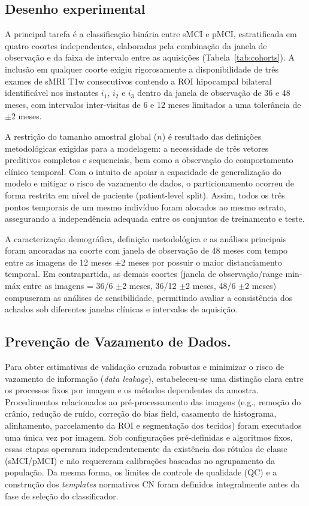 \documentclass[review]{elsarticle}
\begin{document}
	\subsection{Desenho experimental}\label{sec:experiments}
	
	A principal tarefa é a classificação binária entre sMCI e pMCI, estratificada em quatro coortes independentes, elaboradas pela combinação da janela de observação e da faixa de intervalo entre as aquisições (Tabela~\ref{tab:cohorts}). A inclusão em qualquer coorte exigiu rigorosamente a disponibilidade de três exames de sMRI T1w consecutivos contendo a ROI hipocampal bilateral identificável nos instantes $i_1$, $i_2$ e $i_3$ dentro da janela de observação de 36 e 48 meses, com intervalos inter-visitas de 6 e 12 meses limitados a uma tolerância de $\pm 2$ meses.
	
	A restrição do tamanho amostral global ($n$) é resultado das definições metodológicas exigidas para a modelagem: a necessidade de três vetores preditivos completos e sequenciais, bem como a observação do comportamento clínico temporal. Com o intuito de apoiar a capacidade de generalização do modelo e mitigar o risco de vazamento de dados, o particionamento ocorreu de forma restrita em nível de paciente (patient-level split). Assim, todos os três pontos temporais de um mesmo indivíduo foram alocados ao mesmo estrato, assegurando a independência adequada entre os conjuntos de treinamento e teste.
	
	A caracterização demográfica, definição metodológica e as análises principais foram ancoradas na coorte com janela de observação de 48 meses com tempo entre as imagens de 12 meses $\pm$2 meses por possuir o maior distanciamento temporal. Em contrapartida, as demais coortes (janela de observação/range min-máx entre as imagens = 36/6 $\pm$2 meses, 36/12 $\pm$2 meses, 48/6 $\pm$2 meses) compuseram as análises de sensibilidade, permitindo avaliar a consistência dos achados sob diferentes janelas clínicas e intervalos de aquisição.
	
	\subsection{Prevenção de Vazamento de Dados.}\label{subsubsec:anti-leakage} Para obter estimativas de validação cruzada robustas e minimizar o risco de vazamento de informação (\emph{data leakage}), estabeleceu-se uma distinção clara entre os processos fixos por imagem e os métodos dependentes da amostra. Procedimentos relacionados ao pré-processamento das imagens (e.g., remoção do crânio, redução de ruído, correção do bias field, casamento de histograma, alinhamento, parcelamento da ROI e segmentação dos tecidos) foram executados uma única vez por imagem. Sob configurações pré-definidas e algoritmos fixos, essas etapas operaram independentemente da existência dos rótulos de classe (sMCI/pMCI) e não requereram calibrações baseadas no agrupamento da população. Da mesma forma, os limites de controle de qualidade (QC) e a construção dos \emph{templates} normativos CN foram definidos integralmente antes da fase de seleção do classificador.
	
\end{document}
